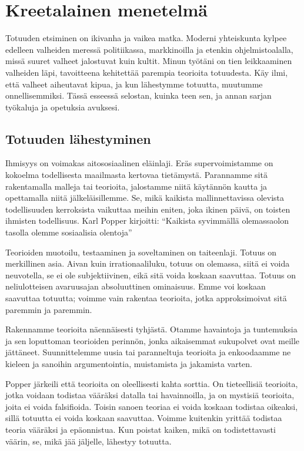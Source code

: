 \chapter{Kreetalainen menetelmä}\label{the-cretan-method}

Totuuden etsiminen on ikivanha ja vaikea matka. Moderni yhteiskunta kylpee edelleen valheiden meressä politiikassa, markkinoilla ja etenkin ohjelmistoalalla, missä suuret valheet jalostuvat kuin kultit. Minun työtäni on tien leikkaaminen valheiden läpi, tavoitteena kehitettää parempia teorioita totuudesta. Käy ilmi, että valheet aiheutavat kipua, ja kun lähestymme totuutta, muutumme onnellisemmiksi. Tässä esseessä selostan, kuinka teen sen, ja annan sarjan työkaluja ja opetuksia avuksesi.

\section{Totuuden lähestyminen}

Ihmisyys on voimakas aitososiaalinen eläinlaji. Eräs supervoimistamme on kokoelma todellisesta maailmasta kertovaa tietämystä. Parannamme sitä rakentamalla malleja tai teorioita, jalostamme niitä käytännön kautta ja opettamalla niitä jälkeläisillemme. Se, mikä kaikista mallinnettavissa olevista todellisuuden kerroksista vaikuttaa meihin eniten, joka ikinen päivä, on toisten ihmisten todellisuus. Karl Popper kirjoitti: ``Kaikista syvimmällä olemassaolon tasolla olemme sosiaalisia olentoja''

Teorioiden muotoilu, testaaminen ja soveltaminen on taiteenlaji. Totuus on merkillinen asia. Aivan kuin irrationaaliluku, totuus on olemassa, siitä ei voida neuvotella, se ei ole subjektiivinen, eikä sitä voida koskaan saavuttaa. Totuus on neliulotteisen avaruusajan absoluuttinen ominaisuus. Emme voi koskaan saavuttaa totuutta; voimme vain rakentaa teorioita, jotka approksimoivat sitä paremmin ja paremmin.

Rakennamme teorioita näennäisesti tyhjästä. Otamme havaintoja ja tuntemuksia ja sen loputtoman teorioiden perinnön, jonka aikaisemmat sukupolvet ovat meille jättäneet. Suunnittelemme uusia tai paranneltuja teorioita ja enkoodaamme ne kieleen ja sanoihin argumentointia, muistamista ja jakamista varten.

Popper järkeili että teorioita on oleellisesti kahta sorttia. On tieteellisiä teorioita, jotka voidaan todistaa vääräksi datalla tai havainnoilla, ja on mystisiä teorioita, joita ei voida falsifioida. Toisin sanoen teoriaa ei voida koskaan todistaa oikeaksi, sillä totuutta ei voida koskaan saavuttaa. Voimme kuitenkin yrittää todistaa teoria vääräksi ja epäonnistua. Kun poistat kaiken, mikä on todistettavasti väärin, se, mikä jää jäljelle, lähestyy totuutta.

